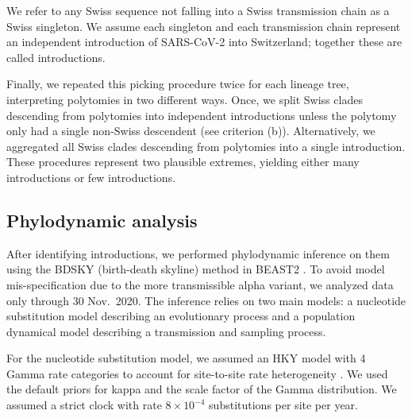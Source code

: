 \documentclass[9pt,twoside,lineno]{pnas-new} %
\begin{document}
We refer to any Swiss sequence not falling into a Swiss transmission chain as a Swiss singleton. We assume each singleton and each transmission chain represent an independent introduction of SARS-CoV-2 into Switzerland; together these are called introductions.

Finally, we repeated this picking procedure twice for each lineage tree, interpreting polytomies in two different ways. Once, we split Swiss clades descending from polytomies into independent introductions unless the polytomy only had a single non-Swiss descendent (see criterion (b)). Alternatively, we aggregated all Swiss clades descending from polytomies into a single introduction. These procedures represent two plausible extremes, yielding either many introductions or few introductions.

\subsection*{Phylodynamic analysis}

After identifying introductions, we performed phylodynamic inference on them using the BDSKY (birth-death skyline) method \cite{stadler2013birth} in BEAST2 \cite{Bouckaert2019}. To avoid model mis-specification due to the more transmissible alpha variant, we analyzed data only through 30 Nov.~2020.  The inference relies on two main models: a nucleotide substitution model describing an evolutionary process and a population dynamical model describing a transmission and sampling process. 


For the nucleotide substitution model, we assumed an HKY \cite{Hasegawa1985} model with 4 Gamma rate categories to account for site-to-site rate heterogeneity \cite{Yang1994}. We used the default priors for kappa and the scale factor of the Gamma distribution. We assumed a strict clock with rate $8\times 10^{-4}$ substitutions per site per year.
\end{document}
